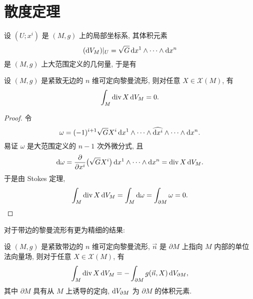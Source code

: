\section{散度定理}



设 $(U;x^i)$ 是 $(M,g)$ 上的局部坐标系, 其体积元素
\[(\mathop{}\!\mathrm{d} V_M)|_U = \sqrt{G}\mathop{}\!\mathrm{d} x^1\wedge\cdots\wedge\mathop{}\!\mathrm{d} x^n\]
是 $(M,g)$ 上大范围定义的几何量, 于是有

\begin{theorem}
  设 $(M,g)$ 是紧致无边的 $n$ 维可定向黎曼流形, 则对任意 $X\in\mathscr{X}(M)$, 有
  \[\int_M \operatorname{div} X\mathop{}\!\mathrm{d} V_M = 0.\]
\end{theorem}

\begin{proof}
  令
  \[\omega = (-1)^{i+1}\sqrt{G}X^i\mathop{}\!\mathrm{d} x^1\wedge\cdots\wedge\widehat{\mathop{}\!\mathrm{d} x^i}
    \wedge\cdots\wedge\mathop{}\!\mathrm{d} x^n.\]
  易证 $\omega$ 是大范围定义的 $n-1$ 次外微分式, 且
  \[\mathop{}\!\mathrm{d}\omega = \pdv{x^i}\bigl(\sqrt{G}X^i\bigr)\mathop{}\!\mathrm{d} x^1\wedge\cdots\wedge\mathop{}\!\mathrm{d} x^n
    = \operatorname{div} X\mathop{}\!\mathrm{d} V_M.\]
  于是由 Stokes 定理,
  \[\int_{M} \operatorname{div} X\mathop{}\!\mathrm{d} V_M = \int_M \mathop{}\!\mathrm{d}\omega = \int_{\partial M} \omega = 0.\qedhere\]
\end{proof}

对于带边的黎曼流形有更为精细的结果:
\begin{theorem}
  设 $(M,g)$ 是紧致带边的 $n$ 维可定向黎曼流形, $\vec{n}$ 是 $\partial M$
  上指向 $M$ 内部的单位法向量场, 则对于任意 $X\in\mathscr{X}(M)$, 有
  \[\int_M \operatorname{div} X\mathop{}\!\mathrm{d} V_M = -\int_{\partial M} g(\vec{n},X)\mathop{}\!\mathrm{d} V_{\partial M},\]
  其中 $\partial M$ 具有从 $M$ 上诱导的定向, $\mathop{}\!\mathrm{d} V_{\partial M}$ 为 $\partial M$ 的体积元素.
\end{theorem}

